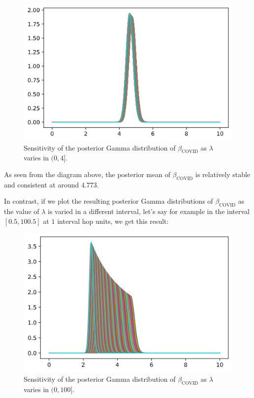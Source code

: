 \documentclass[11pt,fancychapters]{article}
\begin{document}
\begin{figure}[H]\label{fig:normal_sensitivity}
\centering
\includegraphics[width=.9\textwidth]{diagrams/normal_sensitivity.png}
\caption{Sensitivity of the posterior Gamma distribution of $\beta_\text{COVID}$ as $\lambda$ varies in $(0, 4]$.}
\label{fig:normal_sensitivity_graph}
\end{figure}

As seen from the diagram above, the posterior mean of $\beta_\text{COVID}$ is relatively stable and consistent at around $4.773$.

In contrast, if we plot the resulting posterior Gamma distributions of $\beta_\text{COVID}$ as the value of $\lambda$ is varied in a different interval, let's say for example in the interval $[0.5, 100.5]$ at $1$ interval hop units, we get this result:

\begin{figure}[H]\label{fig:large_sensitivity}
\centering
\includegraphics[width=.9\textwidth]{diagrams/large_sensitivity.png}
\caption{Sensitivity of the posterior Gamma distribution of $\beta_\text{COVID}$ as $\lambda$ varies in $(0, 100]$.}
\label{fig:large_sensitivity_graph}
\end{figure}
\end{document}
